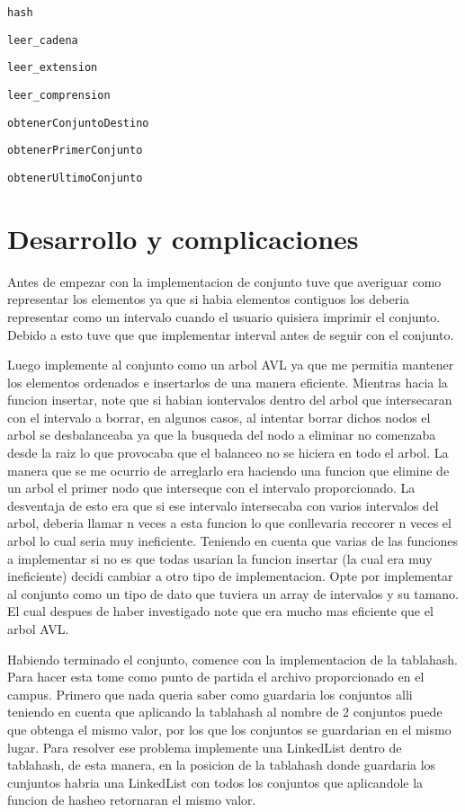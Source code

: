 \documentclass[]{article}
\begin{document}
\verb|hash|

\verb|leer_cadena|

\verb|leer_extension|

\verb|leer_comprension|

\verb|obtenerConjuntoDestino|

\verb|obtenerPrimerConjunto|

\verb|obtenerUltimoConjunto|\\

\section{Desarrollo y complicaciones}
Antes de empezar con la implementacion de conjunto tuve que averiguar como representar los elementos ya que si habia elementos contiguos los deberia representar como un intervalo cuando el usuario quisiera imprimir el conjunto. Debido a esto tuve que que implementar interval antes de seguir con el conjunto. 

Luego implemente al conjunto como un arbol AVL ya que me permitia mantener los elementos ordenados e insertarlos de una manera eficiente. Mientras hacia la funcion insertar, note que si habian iontervalos dentro del arbol que intersecaran con el intervalo a borrar, en algunos casos, al intentar borrar dichos nodos el arbol se desbalanceaba ya que la busqueda del nodo a eliminar no comenzaba desde la raiz lo que provocaba que el balanceo no se hiciera en todo el arbol. La manera que se me ocurrio de arreglarlo era haciendo una funcion que elimine de un arbol el primer nodo que interseque con el intervalo proporcionado. La desventaja de esto era que si ese intervalo intersecaba con varios intervalos del arbol, deberia llamar n veces a esta funcion lo que conllevaria reccorer n veces el arbol lo cual seria muy ineficiente. Teniendo en cuenta que varias de las funciones a implementar si no es que todas usarian la funcion insertar (la cual era muy ineficiente) decidi cambiar a otro tipo de implementacion. Opte por implementar al conjunto como un tipo de dato que tuviera un array de intervalos y su tamano. El cual despues de haber investigado note que era mucho mas eficiente que el arbol AVL.

Habiendo terminado el conjunto, comence con la implementacion de la tablahash. Para hacer esta tome como punto de partida el archivo proporcionado en el campus. Primero que nada queria saber como guardaria los conjuntos alli teniendo en cuenta que aplicando la tablahash al nombre de 2 conjuntos puede que obtenga el mismo valor, por los que los conjuntos se guardarian en el mismo lugar. Para resolver ese problema implemente una LinkedList dentro de tablahash, de esta manera, en la posicion de la tablahash donde guardaria los cunjuntos habria una LinkedList con todos los conjuntos que aplicandole la funcion de hasheo retornaran el mismo valor.
\end{document}

